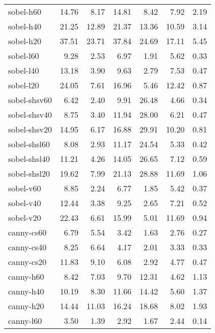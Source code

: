 \begin{tabular}{lrrrrrr}
sobel-h60           &   14.76 &    8.17 &   14.81 &    8.42 &    7.92 &    2.19 \\
sobel-h40           &   21.25 &   12.89 &   21.37 &   13.36 &   10.59 &    3.14 \\
sobel-h20           &   37.51 &   23.71 &   37.84 &   24.69 &   17.11 &    5.45 \\
sobel-l60           &    9.28 &    2.53 &    6.97 &    1.91 &    5.62 &    0.33 \\
sobel-l40           &   13.18 &    3.90 &    9.63 &    2.79 &    7.53 &    0.47 \\
sobel-l20           &   24.05 &    7.61 &   16.96 &    5.46 &   12.42 &    0.87 \\
sobel-shsv60        &    6.42 &    2.40 &    9.91 &   26.48 &    4.66 &    0.34 \\
sobel-shsv40        &    8.75 &    3.40 &   11.94 &   28.00 &    6.21 &    0.47 \\
sobel-shsv20        &   14.95 &    6.17 &   16.88 &   29.91 &   10.20 &    0.81 \\
sobel-shsl60        &    8.08 &    2.93 &   11.17 &   24.54 &    5.33 &    0.42 \\
sobel-shsl40        &   11.21 &    4.26 &   14.05 &   26.65 &    7.12 &    0.59 \\
sobel-shsl20        &   19.62 &    7.99 &   21.13 &   28.88 &   11.69 &    1.06 \\
sobel-v60           &    8.85 &    2.24 &    6.77 &    1.85 &    5.42 &    0.37 \\
sobel-v40           &   12.44 &    3.38 &    9.25 &    2.65 &    7.21 &    0.52 \\
sobel-v20           &   22.43 &    6.61 &   15.99 &    5.01 &   11.69 &    0.94 \\
canny-cs60          &    6.79 &    5.54 &    3.42 &    1.63 &    2.76 &    0.27 \\
canny-cs40          &    8.25 &    6.64 &    4.17 &    2.01 &    3.33 &    0.33 \\
canny-cs20          &   11.83 &    9.10 &    6.08 &    2.92 &    4.77 &    0.47 \\
canny-h60           &    8.42 &    7.03 &    9.70 &   12.31 &    4.62 &    1.13 \\
canny-h40           &   10.19 &    8.30 &   11.66 &   14.42 &    5.60 &    1.37 \\
canny-h20           &   14.44 &   11.03 &   16.24 &   18.68 &    8.02 &    1.93 \\
canny-l60           &    3.50 &    1.39 &    2.92 &    1.67 &    2.44 &    0.14 \\

\end{tabular}
